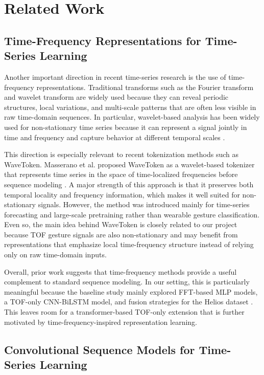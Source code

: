 \documentclass[conference]{IEEEtran}
\begin{document}
\clearpage
\section{Related Work}

\subsection{Time-Frequency Representations for Time-Series Learning}

Another important direction in recent time-series research is the use of time-frequency representations. Traditional transforms such as the Fourier transform and wavelet transform are widely used because they can reveal periodic structures, local variations, and multi-scale patterns that are often less visible in raw time-domain sequences. In particular, wavelet-based analysis has been widely used for non-stationary time series because it can represent a signal jointly in time and frequency and capture behavior at different temporal scales \cite{mallat1989wavelet,rhif2019wavelet}.

This direction is especially relevant to recent tokenization methods such as WaveToken. Masserano et al. proposed WaveToken as a wavelet-based tokenizer that represents time series in the space of time-localized frequencies before sequence modeling \cite{masserano2025wavetoken}. A major strength of this approach is that it preserves both temporal locality and frequency information, which makes it well suited for non-stationary signals. However, the method was introduced mainly for time-series forecasting and large-scale pretraining rather than wearable gesture classification. Even so, the main idea behind WaveToken is closely related to our project because TOF gesture signals are also non-stationary and may benefit from representations that emphasize local time-frequency structure instead of relying only on raw time-domain inputs.

Overall, prior work suggests that time-frequency methods provide a useful complement to standard sequence modeling. In our setting, this is particularly meaningful because the baseline study mainly explored FFT-based MLP models, a TOF-only CNN-BiLSTM model, and fusion strategies for the Helios dataset \cite{zhang2025bfrb}. This leaves room for a transformer-based TOF-only extension that is further motivated by time-frequency-inspired representation learning.

\subsection{Convolutional Sequence Models for Time-Series Learning}
\end{document}
